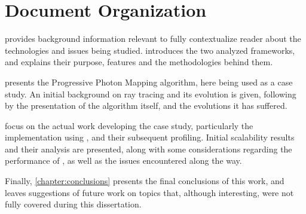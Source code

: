 \documentclass[main.tex]{subfiles}
\begin{document}
\section{Document Organization}

 provides background information relevant to fully contextualize reader about the technologies and issues being studied.  introduces the two analyzed frameworks, and explains their purpose, features and the methodologies behind them.

 presents the Progressive Photon Mapping algorithm, here being used as a case study. An initial background on ray tracing and its evolution is given, following by the presentation of the algorithm itself, and the evolutions it has suffered.

 focus on the actual work developing the case study, particularly the implementation using \starpu, and their subsequent profiling. Initial scalability results and their analysis are presented, along with some considerations regarding the performance of \starpu, as well as the issues encountered along the way.

Finally, \cref{chapter:conclusions} presents the final conclusions of this work, and leaves suggestions of future work on topics that, although interesting, were not fully covered during this dissertation.
\end{document}
